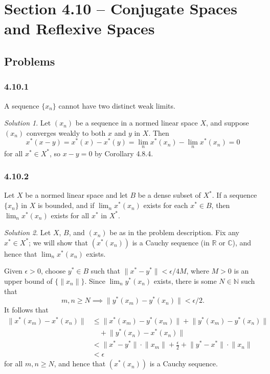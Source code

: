 \documentclass{report}
\newcommand{\bb}[1]{\mathbb{#1}}
\newcommand{\norm}[1]{{\lVert #1 \rVert}}
\theoremstyle{remark}
\newtheorem*{solution}{Solution}
\begin{document}
\section*{Section 4.10 -- Conjugate Spaces and Reflexive Spaces}

\subsection*{Problems}

\subsubsection*{4.10.1}
A sequence $\{x_n\}$ cannot have two distinct weak limits.

\begin{solution}
  Let $(x_n)$ be a sequence in a normed linear space $X$, and suppose $(x_n)$ converges weakly to both $x$ and $y$ in $X$. Then
  \begin{equation*}
    x^*(x - y) = x^*(x) - x^*(y) = \lim_n x^*(x_n) - \lim_n x^*(x_n) = 0
  \end{equation*}
  for all $x^* \in X^*$, so $x - y = 0$ by Corollary 4.8.4.
\end{solution}

\subsubsection*{4.10.2}
Let $X$ be a normed linear space and let $B$ be a dense subset of $X^*$. If a sequence $\{x_n\}$ in $X$ is bounded, and if $\lim_n x^*(x_n)$ exists for each $x^* \in B$, then $\lim_n x^*(x_n)$ exists for all $x^*$ in $X^*$.

\begin{solution}
  Let $X$, $B$, and $(x_n)$ be as in the problem description. Fix any $x^* \in X^*$; we will show that $(x^*(x_n))$ is a Cauchy sequence (in $\bb R$ or $\bb C$), and hence that $\lim_n x^*(x_n)$ exists.

  Given $\epsilon > 0$, choose $y^* \in B$ such that $\norm{x^* - y^*} < \epsilon/4M$, where $M > 0$ is an upper bound of $\{\norm{x_n}\}$. Since $\lim_n y^*(x_n)$ exists, there is some $N \in \bb N$ such that
  \begin{equation*}
    m, n \ge N \implies \norm{y^*(x_m) - y^*(x_n)} < \epsilon/2.
  \end{equation*}
  It follows that
  \begin{equation*}
    \begin{split}
      \norm{x^*(x_m) - x^*(x_n)} &\le \norm{x^*(x_m) - y^*(x_m)} + \norm{y^*(x_m) - y^*(x_n)} \\
      &\quad + \norm{y^*(x_n) - x^*(x_n)} \\
      &< \norm{x^* - y^*} \cdot \norm{x_m} + \frac{\epsilon}{2} + \norm{y^* - x^*} \cdot \norm{x_n} \\
      &< \epsilon
    \end{split}
  \end{equation*}
  for all $m,n \ge N$, and hence that $(x^*(x_n))$ is a Cauchy sequence.
\end{solution}
\end{document}
